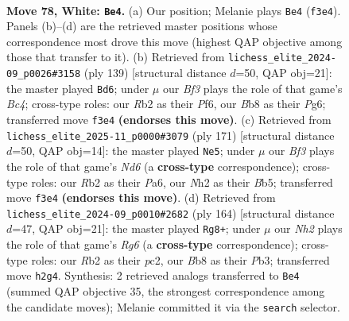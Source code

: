 \documentclass[11pt]{article}
\begin{document}
\clearpage

\begin{figure}[p]\centering
\begin{subfigure}{0.46\textwidth}\centering
\resizebox{\linewidth}{!}{%
\newchessgame
\chessboard[
  setfen={1Bb2k2/8/8/5r2/PP6/2K2B1p/1R5N/8 w - - 13 78},
  showmover=false,
  pgfstyle=straightmove, color=movearrow, markmove={f3-e4}
]}
\caption{}
\end{subfigure}\hfill
\begin{subfigure}{0.46\textwidth}\centering
\resizebox{\linewidth}{!}{%
\newchessgame
\chessboard[
  setfen={8/5k2/5pp1/R1b4p/7P/2Bn1b2/8/5K2 b - - 1 70},
  showmover=false,
  pgfstyle=straightmove, color=movearrow, markmove={c5-d6}
]}
\caption{}
\end{subfigure}
\\[4pt]
\begin{subfigure}{0.46\textwidth}\centering
\resizebox{\linewidth}{!}{%
\newchessgame
\chessboard[
  setfen={8/2K5/p2R4/Pbp5/4k3/3n4/3B4/8 b - - 50 86},
  showmover=false,
  pgfstyle=straightmove, color=movearrow, markmove={d3-e5}
]}
\caption{}
\end{subfigure}\hfill
\begin{subfigure}{0.46\textwidth}\centering
\resizebox{\linewidth}{!}{%
\newchessgame
\chessboard[
  setfen={4r2k/7P/4B1RK/8/1p6/1P3P2/2p5/8 w - - 0 83},
  showmover=false,
  pgfstyle=straightmove, color=movearrow, markmove={g6-g8}
]}
\caption{}
\end{subfigure}
\caption{\textbf{Move 78, White: \texttt{Be4}.} (a) Our position; Melanie plays \texttt{Be4} (\texttt{f3e4}). Panels (b)--(d) are the retrieved master positions whose correspondence most drove this move (highest QAP objective among those that transfer to it). (b) Retrieved from \texttt{lichess\_elite\_2024-09\_p0026\#3158} (ply 139) [structural distance $d$=50, QAP obj=21]: the master played \texttt{Bd6}; under $\mu$ our \emph{Bf3} plays the role of that game's \emph{Bc4}; cross-type roles: our \emph{R}b2 as their \emph{P}f6, our \emph{B}b8 as their \emph{P}g6; transferred move \texttt{f3e4} \textbf{(endorses this move)}. (c) Retrieved from \texttt{lichess\_elite\_2025-11\_p0000\#3079} (ply 171) [structural distance $d$=50, QAP obj=14]: the master played \texttt{Ne5}; under $\mu$ our \emph{Bf3} plays the role of that game's \emph{Nd6} (a \textbf{cross-type} correspondence); cross-type roles: our \emph{R}b2 as their \emph{P}a6, our \emph{N}h2 as their \emph{B}b5; transferred move \texttt{f3e4} \textbf{(endorses this move)}. (d) Retrieved from \texttt{lichess\_elite\_2024-09\_p0010\#2682} (ply 164) [structural distance $d$=47, QAP obj=21]: the master played \texttt{Rg8+}; under $\mu$ our \emph{Nh2} plays the role of that game's \emph{Rg6} (a \textbf{cross-type} correspondence); cross-type roles: our \emph{R}b2 as their \emph{p}c2, our \emph{B}b8 as their \emph{P}b3; transferred move \texttt{h2g4}. Synthesis: 2 retrieved analogs transferred to \texttt{Be4} (summed QAP objective 35, the strongest correspondence among the candidate moves); Melanie committed it via the \texttt{search} selector.}
\label{fig:thought-m154}
\end{figure}
\end{document}
